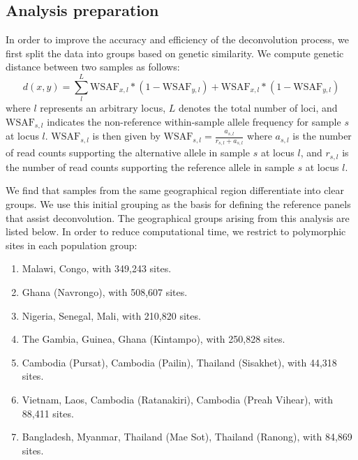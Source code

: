 \documentclass[9pt]{article}
\begin{document}
\subsection{Analysis preparation}
In order to improve the accuracy and efficiency of the deconvolution process, we first split the  data into groups based on genetic similarity. We compute genetic distance between two samples as follows:
\begin{equation}
d(x, y) = \sum_{l}^{L}\textrm{WSAF}_{x,l} * (1-\textrm{WSAF}_{y,l}) + \textrm{WSAF}_{x,l} * (1-\textrm{WSAF}_{y,l})
\end{equation}
where $l$ represents an arbitrary locus, $L$ denotes the total number of loci, and $\textrm{WSAF}_{s,l}$ indicates the non-reference within-sample allele frequency for sample $s$ at locus $l$. $\textrm{WSAF}_{s,l}$ is then given by $\textrm{WSAF}_{s,l} = \frac{a_{s,l}}{r_{s,l}+a_{s,l}}$ where $a_{s,l}$ is the number of read counts supporting the alternative allele in sample $s$ at locus $l$, and $r_{s,l}$ is the number of read counts supporting the reference allele in sample $s$ at locus $l$.

We find that samples from the same geographical region differentiate into clear groups. We use this initial grouping as the basis for defining the reference panels that assist deconvolution. The geographical groups arising from this analysis are listed below. In order to reduce computational time, we restrict to polymorphic sites in each population group:
\begin{enumerate}
  \item Malawi, Congo, with 349,243 sites.
  \item Ghana (Navrongo), with 508,607 sites.
  \item Nigeria, Senegal, Mali, with 210,820 sites.
  \item The Gambia, Guinea, Ghana (Kintampo), with 250,828 sites.
  \item Cambodia (Pursat), Cambodia (Pailin), Thailand (Sisakhet), with 44,318 sites.
  \item Vietnam, Laos, Cambodia (Ratanakiri), Cambodia (Preah Vihear), with 88,411 sites.
  \item Bangladesh, Myanmar, Thailand (Mae Sot), Thailand (Ranong), with 84,869 sites.
\end{enumerate}


\end{document}
